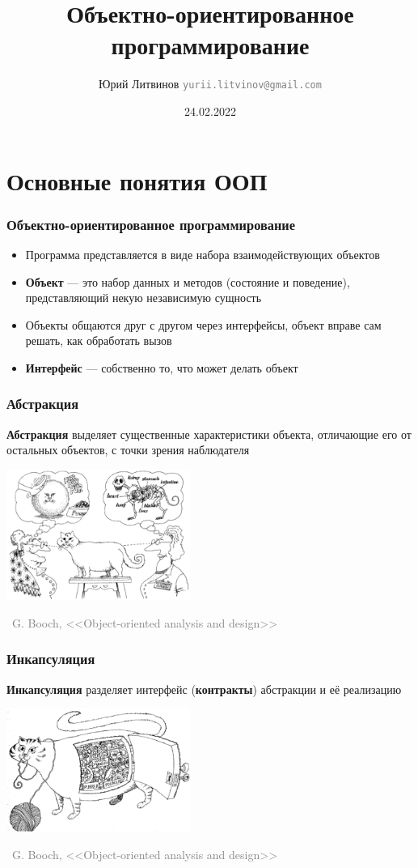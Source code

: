 \documentclass[xetex,mathserif,serif]{beamer}
\title{Объектно-ориентированное программирование}
\author[Юрий Литвинов]{Юрий Литвинов \newline \textcolor{gray}{\small\texttt{yurii.litvinov@gmail.com}}}
\date{24.02.2022}
\newcommand{\attribution}[1] {
    \begin{flushright}\begin{scriptsize}\textcolor{gray}{\textcopyright\, #1}\end{scriptsize}\end{flushright}
}
\begin{document}
    
    \frame{\titlepage}

    \section{Основные понятия ООП}

    \begin{frame}
        \frametitle{Объектно-ориентированное программирование}
        \begin{itemize}
            \item Программа представляется в виде набора взаимодействующих объектов
            \item \textbf{Объект} --- это набор данных и методов (состояние и поведение), представляющий некую независимую сущность
            \item Объекты общаются друг с другом через интерфейсы, объект вправе сам решать, как обработать вызов
            \item \textbf{Интерфейс} --- собственно то, что может делать объект
        \end{itemize}
    \end{frame}

    \begin{frame}
        \frametitle{Абстракция}
        \textbf{Абстракция} выделяет существенные характеристики объекта, отличающие его от остальных объектов, с точки зрения наблюдателя
        \vskip 1cm
        \begin{center}
            \includegraphics[width=0.45\textwidth]{abstraction.png}
        \end{center}
        \attribution{G. Booch, <<Object-oriented analysis and design>>}
    \end{frame}

    \begin{frame}
        \frametitle{Инкапсуляция}
        \textbf{Инкапсуляция} разделяет интерфейс (\textbf{контракты}) абстракции и её реализацию

        \vskip 1cm
        \begin{center}
            \includegraphics[width=0.45\textwidth]{incapsulation.png}
        \end{center}
        \attribution{G. Booch, <<Object-oriented analysis and design>>}
    \end{frame}
\end{document}
